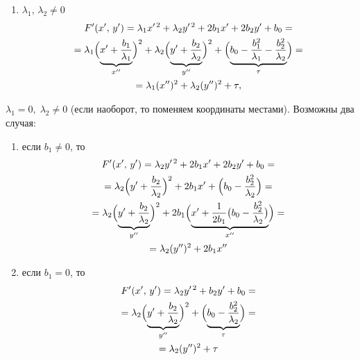 \begin{Proof}
  \begin{enumerate}
    \item $\lambda_1, \, \lambda_2 \neq 0$
    \begin{gather*}
      F'(x', \, y') = \lambda_1 x'^{\, 2} + \lambda_2 y'^{\, 2} + 2b_1x' + 2b_2y' + b_0 =\\
      =\lambda_1 \Bigl(\underbrace{x' + \frac{b_1}{\lambda_1}}_{x''}\Bigr)^2 + \lambda_2\Bigl(\underbrace{y' + \frac{b_2}{\lambda_2}}_{y''}\Bigr)^2 + \Bigl(\underbrace{b_0 - \frac{b_1^2}{\lambda_1} - \frac{b_2^2}{\lambda_2}}_{\tau}\Bigr) = \\
      = \lambda_1(x'')^2 + \lambda_2(y'')^2 + \tau,
    \end{gather*}
  \end{enumerate}
  \item $\lambda_1 = 0, \; \lambda_2 \neq 0$ (если наоборот, то поменяем координаты местами). Возможны два случая:
  \begin{enumerate}
    \item если $b_1 \neq 0$, то 
    \begin{gather*}
      F'(x', \, y') = \lambda_2 y'^{\, 2} + 2b_1x' + 2b_2y' + b_0 =\\
      = \lambda_2\Bigl(y' + \frac{b_2}{\lambda_2} \Bigr)^2 + 2b_1x' + \Bigl(b_0 - \frac{b_2^2}{\lambda_2}\Bigr) = \\
      = \lambda_2\Bigl(\underbrace{y' + \frac{b_2}{\lambda_2}}_{y''} \Bigr)^2 + 2b_1\Bigl(\underbrace{x' + \frac{1}{2b_1}\bigl(b_0 - \frac{b_2^2}{\lambda_2}\bigr)}_{x''}\Bigr) = \\
      = \lambda_2(y'')^2 + 2b_1x''
    \end{gather*}
    \item если $b_1 = 0$, то
    \begin{gather*}
      F'(x', \, y') = \lambda_2 y'^{\, 2} + b_2y' + b_0 = \\
      = \lambda_2\Bigl(\underbrace{y' + \frac{b_2}{\lambda_2}}_{y''}\Bigr)^2 + \Bigl(\underbrace{b_0 - \frac{b_2^2}{\lambda_2}}_{\tau}\Bigr) = \\
      = \lambda_2(y'')^2 + \tau
    \end{gather*}
  \end{enumerate}
\end{Proof}

